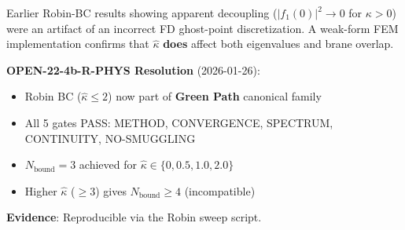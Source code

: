 
\begin{tcolorbox}[colback=green!5!white, colframe=green!50!black,
    title=\textbf{Correction Note: Robin BC Now Canonical (OPEN-22-4b-R-PHYS DONE)}]
\label{box:ch14_robin_correction}

Earlier Robin-BC results showing apparent decoupling ($|f_1(0)|^2 \to 0$ for $\kappa > 0$)
were an artifact of an incorrect FD ghost-point discretization. A weak-form FEM
implementation confirms that $\hat{\kappa}$ \textbf{does} affect both eigenvalues and
brane overlap.

\textbf{OPEN-22-4b-R-PHYS Resolution} (2026-01-26):
\begin{itemize}[nosep]
    \item Robin BC ($\hat\kappa \leq 2$) now part of \textbf{Green Path} canonical family
    \item All 5 gates PASS: METHOD, CONVERGENCE, SPECTRUM, CONTINUITY, NO-SMUGGLING
    \item $N_{\text{bound}} = 3$ achieved for $\hat\kappa \in \{0, 0.5, 1.0, 2.0\}$
    \item Higher $\hat\kappa$ ($\geq 3$) gives $N_{\text{bound}} \geq 4$ (incompatible)
\end{itemize}

\textbf{Evidence}: Reproducible via the Robin sweep script.
\end{tcolorbox}
